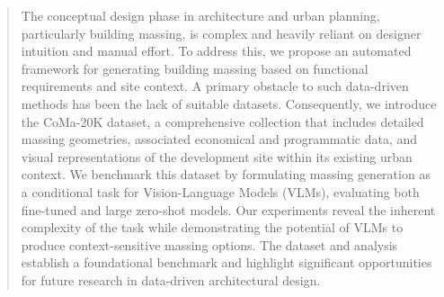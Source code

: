 \begin{abstract}
The conceptual design phase in architecture and urban planning, particularly building massing, is complex and heavily reliant on designer intuition and manual effort. To address this, we propose an automated framework for generating building massing based on functional requirements and site context. A primary obstacle to such data-driven methods has been the lack of suitable datasets. Consequently, we introduce the CoMa-20K dataset, a comprehensive collection that includes detailed massing geometries, associated economical and programmatic data, and visual representations of the development site within its existing urban context. We benchmark this dataset by formulating massing generation as a conditional task for Vision-Language Models (VLMs), evaluating both fine-tuned and large zero-shot models. Our experiments reveal the inherent complexity of the task while demonstrating the potential of VLMs to produce context-sensitive massing options. The dataset and analysis establish a foundational benchmark and highlight significant opportunities for future research in data-driven architectural design.
\end{abstract}